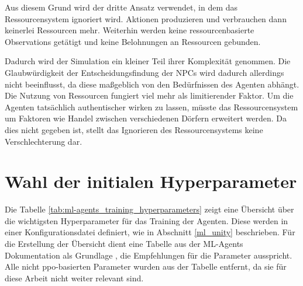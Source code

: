 Aus diesem Grund wird der dritte Ansatz verwendet, in dem das Ressourcensystem ignoriert wird. Aktionen produzieren und verbrauchen dann keinerlei Ressourcen mehr. Weiterhin werden keine ressourcenbasierte Observations getätigt und keine Belohnungen an Ressourcen gebunden.

Dadurch wird der Simulation ein kleiner Teil ihrer Komplexität genommen. Die Glaubwürdigkeit der Entscheidungsfindung der NPCs wird dadurch allerdings nicht beeinflusst, da diese maßgeblich von den Bedürfnissen des Agenten abhängt. Die Nutzung von Ressourcen fungiert viel mehr als limitierender Faktor. Um die Agenten tatsächlich authentischer wirken zu lassen, müsste das Ressourcensystem um Faktoren wie Handel zwischen verschiedenen Dörfern erweitert werden. Da dies nicht gegeben ist, stellt das Ignorieren des Ressourcensystems keine Verschlechterung dar.    




\section{Wahl der initialen Hyperparameter}\label{village_training_hyperparameter}
Die Tabelle \ref{tab:ml-agents_training_hyperparameters} zeigt eine Übersicht über die wichtigsten Hyperparameter für das Training der Agenten. Diese werden in einer Konfigurationsdatei definiert, wie in Abschnitt  \ref{ml_unity} beschrieben. Für die Erstellung der Übersicht dient eine Tabelle aus der ML-Agents Dokumentation als Grundlage \cite{ml-agents_documentation_hyperparameter_ppo}, die Empfehlungen für die Parameter ausspricht. Alle nicht \ac{ppo}-basierten Parameter wurden aus der Tabelle entfernt, da sie für diese Arbeit nicht weiter relevant sind.

